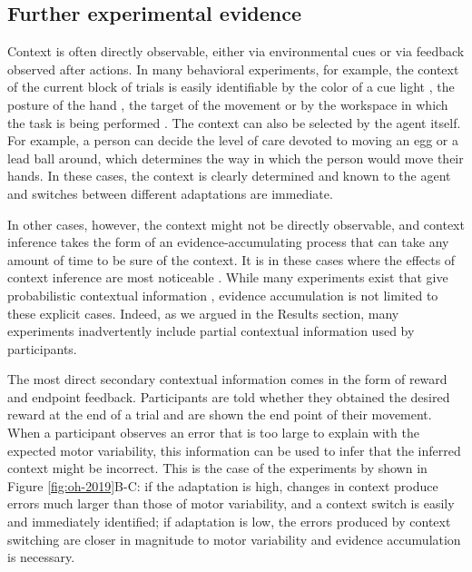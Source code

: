 \documentclass[a4paper,doc,floatsintext,natbib]{apa6}
\def \fref #1{Figure \ref{#1}}     %
\begin{document}
\subsection{Further experimental evidence}
Context is often directly observable, either via environmental cues or via feedback observed after actions. In many behavioral experiments, for example, the context of the current block of trials is easily identifiable by the color of a cue light \citep[e.g.][]{Ethier_Spontaneous_2008}, the posture of the hand \citep[e.g.][]{Gandolfo_Motor_1996}, the target of the movement \citep[e.g.][]{Lee_Dual_2009} or by the workspace in which the task is being performed \citep[e.g.][]{Shadmehr_Adaptive_1994}. The context can also be selected by the agent itself. For example, a person can decide the level of care devoted to moving an egg or a lead ball around, which determines the way in which the person would move their hands. In these cases, the context is clearly determined and known to the agent and switches between different adaptations are immediate.

In other cases, however, the context might not be directly observable, and context inference takes the form of an evidence-accumulating process that can take any amount of time to be sure of the context. It is in these cases where the effects of context inference are most noticeable . While many experiments exist that give probabilistic contextual information \cite[e.g.][]{Scholz_uncontrolled_1999,Behrens_Learning_2007,Nassar_Dissociable_2019}, evidence accumulation is not limited to these explicit cases. Indeed, as we argued in the Results section, many experiments inadvertently include partial contextual information used by participants.

The most direct secondary contextual information comes in the form of reward and endpoint feedback. Participants are told whether they obtained the desired reward at the end of a trial and are shown the end point of their movement. When a participant observes an error that is too large to explain with the expected motor variability, this information can be used to infer that the inferred context might be incorrect. This is the case of the experiments by \cite{Oh_Minimizing_2019} shown in \fref{fig:oh-2019}B-C: if the adaptation is high, changes in context produce errors much larger than those of motor variability, and a context switch is easily and immediately identified; if adaptation is low, the errors produced by context switching are closer in magnitude to motor variability and evidence accumulation is necessary.
\end{document}
